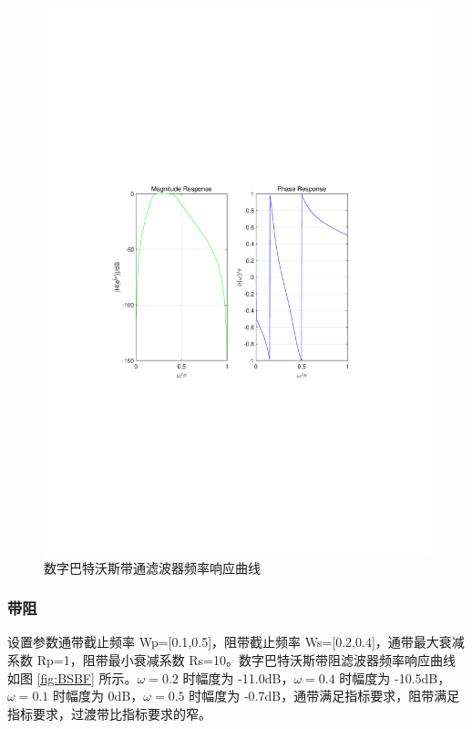 \documentclass[12pt,AutoFakeBold]{article}
\begin{document}
\begin{figure}[hbtp]
	\centering
	\includegraphics[width=14cm]{figure/BPBF.pdf}
	\caption{数字巴特沃斯带通滤波器频率响应曲线} \label{fig:BPBF}
\end{figure}

\subsubsection{带阻}

设置参数通带截止频率 Wp=[0.1,0.5]，阻带截止频率 Ws=[0.2,0.4]，通带最大衰减系数 Rp=1，阻带最小衰减系数 Rs=10。数字巴特沃斯带阻滤波器频率响应曲线如图 \ref{fig:BSBF} 所示。$\omega=0.2$ 时幅度为 -11.0dB，$\omega=0.4$ 时幅度为 -10.5dB，$\omega=0.1$ 时幅度为 0dB，$\omega=0.5$ 时幅度为 -0.7dB，通带满足指标要求，阻带满足指标要求，过渡带比指标要求的窄。
\end{document}
